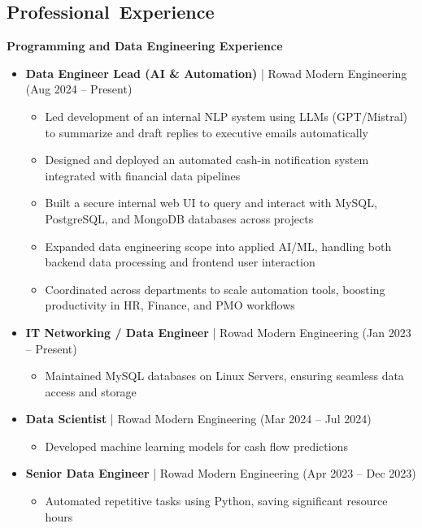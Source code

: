 \documentclass[10pt, letterpaper]{article}
\begin{document}
\begin{mdframed}[style=cvframe]
\begin{multicols}{2}
\section{\mbox{Professional Experience}}  %
\textbf{\textcolor{primaryColor}{Programming and Data Engineering Experience}}
\begin{itemize}[leftmargin=*]
    \item \textbf{Data Engineer Lead (AI \& Automation)} | Rowad Modern Engineering (Aug 2024 -- Present)
    \begin{itemize}[leftmargin=1cm]
        \item Led development of an internal NLP system using LLMs (GPT/Mistral) to summarize and draft replies to executive emails automatically
        \item Designed and deployed an automated cash-in notification system integrated with financial data pipelines
        \item Built a secure internal web UI to query and interact with MySQL, PostgreSQL, and MongoDB databases across projects
        \item Expanded data engineering scope into applied AI/ML, handling both backend data processing and frontend user interaction
        \item Coordinated across departments to scale automation tools, boosting productivity in HR, Finance, and PMO workflows
    \end{itemize}

\columnbreak

    \item \textbf{IT Networking / Data Engineer} | Rowad Modern Engineering (Jan 2023 -- Present)
    \begin{itemize}[leftmargin=1cm]
        \item Maintained MySQL databases on Linux Servers, ensuring seamless data access and storage
    \end{itemize}

    \item \textbf{Data Scientist} | Rowad Modern Engineering (Mar 2024 -- Jul 2024)
    \begin{itemize}[leftmargin=1cm]
        \item Developed machine learning models for cash flow predictions
    \end{itemize}
    
    \item \textbf{Senior Data Engineer} | Rowad Modern Engineering (Apr 2023 -- Dec 2023)
    \begin{itemize}[leftmargin=1cm]
        \item Automated repetitive tasks using Python, saving significant resource hours
    \end{itemize}
\end{itemize}


\end{multicols}
\end{mdframed}
\end{document}

